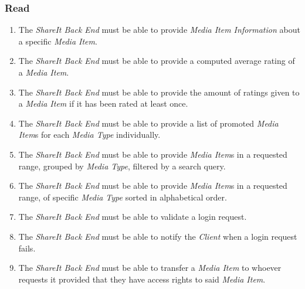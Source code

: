 

%

\noindent

\subsubsection{Read}
\begin{enumerate}[label=\textbf{FR-\twodigits*}, resume]

\item The \textit{ShareIt Back End} must be able to provide \textit{Media Item Information} about a specific \textit{Media Item}.

\item The \textit{ShareIt Back End} must be able to provide a computed average rating of a \textit{Media Item}.

\item The \textit{ShareIt Back End} must be able to provide the amount of ratings given to a \textit{Media Item} if it has been rated at least once.

\item The \textit{ShareIt Back End} must be able to provide a list of promoted \textit{Media Item}s for each \textit{Media Type} individually.

\item The \textit{ShareIt Back End} must be able to provide \textit{Media Item}s in a requested range, grouped by \textit{Media Type}, filtered by a search query.

\item The \textit{ShareIt Back End} must be able to provide \textit{Media Item}s in a requested range, of specific \textit{Media Type} sorted in alphabetical order.

\item The \textit{ShareIt Back End} must be able to validate a login request.

\item The \textit{ShareIt Back End} must be able to notify the \textit{Client} when a login request fails.

\item The \textit{ShareIt Back End} must be able to transfer a \textit{Media Item} to whoever requests it provided that they have access rights to said \textit{Media Item}.


\end{enumerate}
